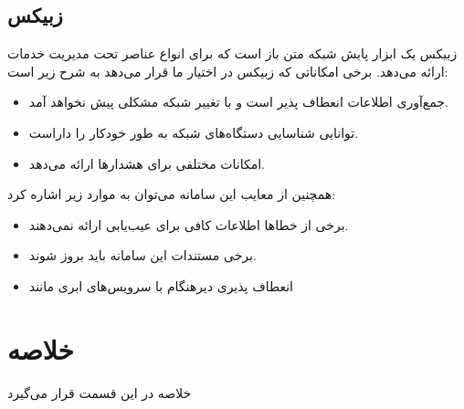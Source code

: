 \subsection{زبیکس}

زبیکس یک ابزار پایش شبکه متن باز است که برای انواع عناصر تحت مدیریت خدمات ارائه می‌دهد. برخی امکاناتی که زبیکس در اختیار ما قرار می‌دهد به شرح زیر است\cite{olups2010zabbix}:

\begin{itemize}
    \item جمع‌آوری اطلاعات انعطاف پذیر است و با تغییر شبکه مشکلی پیش نخواهد آمد.
    \item توانایی شناسایی دستگاه‌های شبکه به طور خودکار را داراست.
    \item امکانات مختلفی برای هشدارها ارائه می‌دهد.
\end{itemize}
\newpage
همچنین از معایب این سامانه می‌توان به موارد زیر اشاره کرد:

\begin{itemize}
    \item برخی از خطاها اطلاعات کافی برای عیب‌یابی ارائه نمی‌دهند.
    \item برخی مستندات این سامانه باید بروز شوند.
    \item انعطاف پذیری دیرهنگام با سرویس‌های ابری مانند 
\end{itemize}

\section{خلاصه}

خلاصه در این قسمت قرار می‌گیرد

